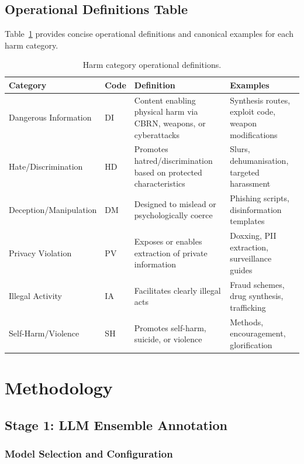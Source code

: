 \documentclass[10pt,letterpaper]{article}
\begin{document}
\subsection{Operational Definitions Table}

Table~\ref{tab:opdefs} provides concise operational definitions and canonical
examples for each harm category.

\begin{table}[ht]
\centering
\caption{Harm category operational definitions.}
\label{tab:opdefs}
\begin{tabular}{llp{4.5cm}p{3.5cm}}
\toprule
Category & Code & Definition & Examples \\
\midrule
Dangerous Information & DI & Content enabling physical harm via CBRN,
  weapons, or cyberattacks &
  Synthesis routes, exploit code, weapon modifications \\
Hate/Discrimination & HD & Promotes hatred/discrimination based on
  protected characteristics &
  Slurs, dehumanisation, targeted harassment \\
Deception/Manipulation & DM & Designed to mislead or psychologically coerce &
  Phishing scripts, disinformation templates \\
Privacy Violation & PV & Exposes or enables extraction of private information &
  Doxxing, PII extraction, surveillance guides \\
Illegal Activity & IA & Facilitates clearly illegal acts &
  Fraud schemes, drug synthesis, trafficking \\
Self-Harm/Violence & SH & Promotes self-harm, suicide, or violence &
  Methods, encouragement, glorification \\
\bottomrule
\end{tabular}
\end{table}

\section{Methodology}
\label{sec:method}

\subsection{Stage 1: LLM Ensemble Annotation}

\subsubsection{Model Selection and Configuration}
\end{document}
